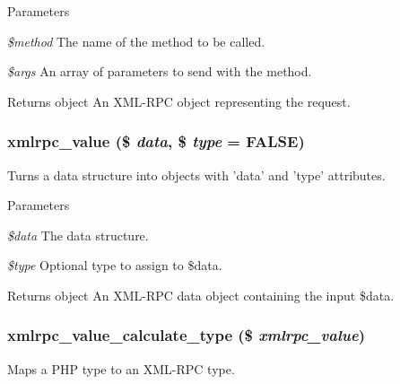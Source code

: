 \begin{DoxyParams}{Parameters}
\item[{\em \$method}]The name of the method to be called. \item[{\em \$args}]An array of parameters to send with the method.\end{DoxyParams}
\begin{DoxyReturn}{Returns}
object An XML-\/RPC object representing the request. 
\end{DoxyReturn}
\hypertarget{xmlrpc_8inc_af88c4a9120094b9280ddc4d90bc51987}{
\subsubsection[{xmlrpc\_\-value}]{\setlength{\rightskip}{0pt plus 5cm}xmlrpc\_\-value (\$ {\em data}, \/  \$ {\em type} = {\ttfamily FALSE})}}
\label{xmlrpc_8inc_af88c4a9120094b9280ddc4d90bc51987}
Turns a data structure into objects with 'data' and 'type' attributes.


\begin{DoxyParams}{Parameters}
\item[{\em \$data}]The data structure. \item[{\em \$type}]Optional type to assign to \$data.\end{DoxyParams}
\begin{DoxyReturn}{Returns}
object An XML-\/RPC data object containing the input \$data. 
\end{DoxyReturn}
\hypertarget{xmlrpc_8inc_a6322ce2ad550e7f873ab2b9cd6699e26}{
\subsubsection[{xmlrpc\_\-value\_\-calculate\_\-type}]{\setlength{\rightskip}{0pt plus 5cm}xmlrpc\_\-value\_\-calculate\_\-type (\$ {\em xmlrpc\_\-value})}}
\label{xmlrpc_8inc_a6322ce2ad550e7f873ab2b9cd6699e26}
Maps a PHP type to an XML-\/RPC type.


